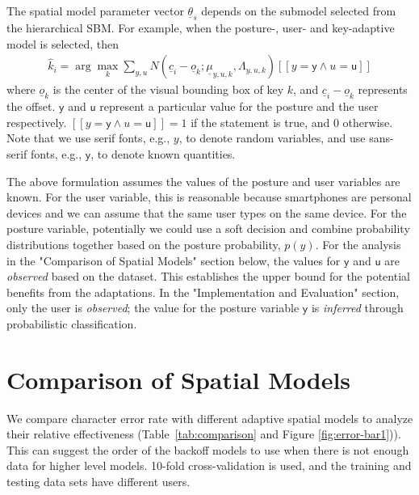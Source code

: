 \documentclass{sigchi}
\begin{document}
The spatial model parameter vector $\underline \theta_s$ depends on the submodel
selected from the hierarchical SBM. For example, when the posture-, user- and key-adaptive model is selected, then
\begin{align}          
\hat k_i = \arg\max_k \sum_{y, u} N(\underline c_i - \underline o_k; \underline\mu_{y,u,k}, \Lambda_{y,u,k})[[y = \textsf{y} \wedge u = \textsf{u}]]
\end{align}
where $\underline o_k$ is the center of the visual bounding box of key $k$, and $\underline c_i - \underline o_k$ 
represents the offset. $\textsf{y}$ and $\textsf{u}$ represent a particular value for the posture 
and the user respectively. $[[y = \textsf{y} \wedge u = \textsf{u}]] = 1$ if the 
statement is true, and $0$ otherwise. Note that we use serif fonts,
e.g., $y$, to denote random variables, and use sans-serif fonts, e.g.,
$\textsf{y}$, to denote known quantities.

The above formulation assumes the values of the posture and user variables are known.  For the user variable, 
this is reasonable because smartphones are personal devices and we can assume that the 
same user types on the same device. For the posture variable, potentially we could 
use a soft decision and combine probability distributions together based on the 
posture probability, $p(y)$. For the analysis in the "Comparison of Spatial
Models" section below, the values for $\textsf{y}$ and $\textsf{u}$ are 
\textit{observed} based on the dataset. This establishes the upper bound for the
potential benefits from the adaptations. In the "Implementation and Evaluation"
section,  only the user is \textit{observed}; the value for the posture variable
$\textsf{y}$ is \textit{inferred} through probabilistic classification.

\section{Comparison of Spatial Models}
We compare character error rate with different adaptive spatial models to analyze their
relative effectiveness (Table~\ref{tab:comparison} and Figure
\ref{fig:error-bar1})). This can suggest the order of the
backoff models to use when there is not enough data for higher level models.
10-fold cross-validation is used, and the training and testing data sets have different users.
\end{document}
